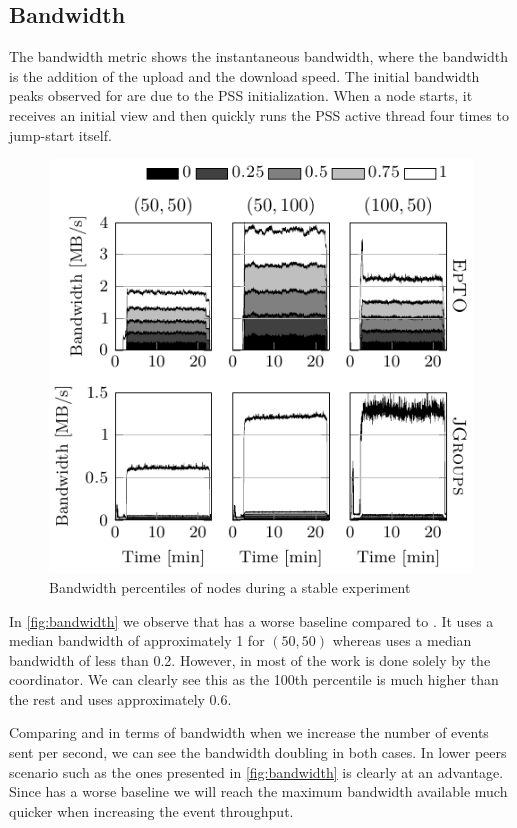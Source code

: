 \subsection{Bandwidth}
The bandwidth metric shows the instantaneous bandwidth, where the bandwidth is the addition of the upload and the download speed.
The initial bandwidth peaks observed for \epto are due to the PSS initialization. When a node starts, it receives an initial view and then quickly runs the PSS active thread four times to jump-start itself.
 \begin{figure}[hpt]
 	\centering
 	\includegraphics[width=\linewidth]{figures/bandwidth-nochurn.pdf}
 	\vspace{-2mm} 
 	\caption{Bandwidth percentiles of nodes during a stable experiment}
 	\vspace{-2mm} 
 	\label{fig:bandwidth}
 \end{figure}
In \autoref{fig:bandwidth} we observe that \epto has a worse baseline compared to \jgroups. It uses a median bandwidth of approximately \SI{1}{\mbps} for $(50,50)$ whereas \jgroups uses a median bandwidth of less than \SI{0.2}{\mbps}. However, in \jgroups most of the work is done solely by the coordinator. We can clearly see this as the 100th percentile is much higher than the rest and uses approximately \SI{.6}{\mbps}.

Comparing \epto and \jgroups in terms of bandwidth when we increase the number of events sent per second, we can see the bandwidth doubling in both cases. In lower peers scenario such as the ones presented in \autoref{fig:bandwidth} \jgroups is clearly at an advantage. Since \epto has a worse baseline we will reach the maximum bandwidth available much quicker when increasing the event throughput.

